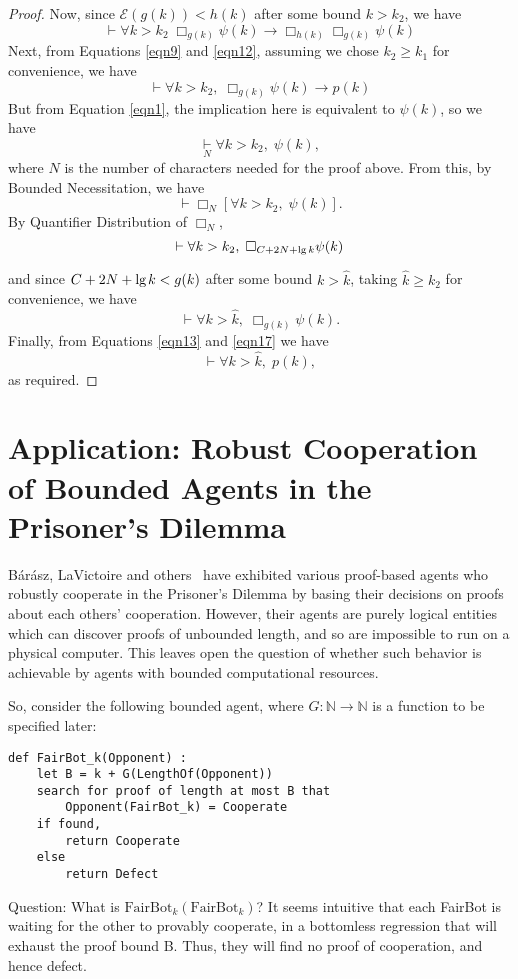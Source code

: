 \documentclass[onecolumn]{miri-tech-article}
\numberwithin{equation}{section}
\newcommand{\eqn}[1]{\begin{equation}#1\end{equation}}
\theoremstyle{definition}
\newcommand{\NN}{\mathbb{N}}
\newcommand{\Ee}{\mathcal{E}}
\newcommand{\proves}[1]{\underset{#1}{\vdash}}
\newcommand{\bx}[1]{\Box_{#1}}
\renewcommand{\implies}{\rightarrow}
\renewcommand{\to}{\rightarrow}
\renewcommand{\lg}{\mathrm{lg\hspace{0.3ex}}}
\renewcommand{\-}{^{-1}}
\newcommand{\FB}{\mathrm{FairBot}}
\begin{document}
\begin{proof}
Now, since $\Ee(g(k)) < h(k)$ after some bound $k>k_2$, we have
\eqn{\label{eqn12}
\proves{} \forall k > k_2 \; \bx{g(k)}\psi(k)\implies \bx{h(k)}\bx{g(k)}\psi(k)
}
Next, from Equations \ref{eqn9} and \ref{eqn12}, assuming we chose $k_2\geq k_1$ for convenience, we have
\eqn{\label{eqn13}
\proves{} \forall k>k_2,\; \bx{g(k)}\psi(k)\implies p(k)
}
But from Equation \ref{eqn1}, the implication here is equivalent to $\psi(k)$, so we have
$$ \proves{N} \forall k>k_2,\; \psi(k),$$
where $N$ is the number of characters needed for the proof above.  From this, by Bounded Necessitation, we have
$$\proves{} \bx{N} [\forall k>k_2,\; \psi(k)].$$
By Quantifier Distribution of $\bx{N}$,
$$\proves{} \forall k>k_2,\; \bx{C + 2N + \lg k} \psi(k)$$
and since $C + 2N + \lg k < g(k)$ after some bound $k>\hat k$, taking $\hat k \geq k_2$ for convenience, we have
\eqn{\label{eqn17}
\proves{}\forall k>\hat k,\; \bx{g(k)}\psi(k).
}
Finally, from Equations \ref{eqn13} and \ref{eqn17} we have
$$\proves{} \forall k>\hat k,\; p(k),$$
as required.
\end{proof}


\section{Application: Robust Cooperation of Bounded Agents in the Prisoner's Dilemma}
\label{sec:robucoop}

B\'{a}r\'{a}sz, LaVictoire and others~\cite{Barasz:2014:RobustCooperation}\cite{LaVictoire:2014:PrisDilemmaLob} have exhibited various proof-based agents who robustly cooperate in the Prisoner's Dilemma by basing their decisions on proofs about each others' cooperation.  However, their agents are purely logical entities which can discover proofs of unbounded length, and so are impossible to run on a physical computer.  This leaves open the question of whether such behavior is achievable by agents with bounded computational resources.

So, consider the following bounded agent, where $G:\NN\to\NN$ is a function to be specified later:

\begin{Verbatim}[frame=single]
def FairBot_k(Opponent) :
	let B = k + G(LengthOf(Opponent))
	search for proof of length at most B that 
		Opponent(FairBot_k) = Cooperate
	if found,
		return Cooperate
	else
		return Defect
\end{Verbatim}

Question: What is $\FB_k(\FB_k)$?  It seems intuitive that each FairBot is waiting for the other to provably cooperate, in a bottomless regression that will exhaust the proof bound B.  Thus, they will find no proof of cooperation, and hence defect.  
\end{document}
